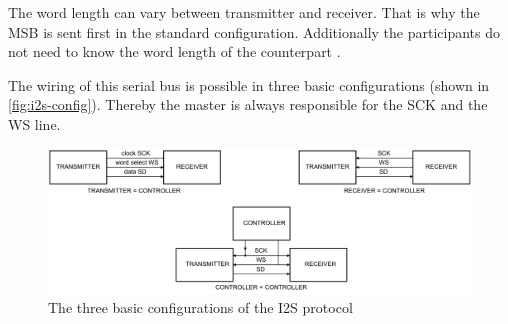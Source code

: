 The word length can vary between transmitter and receiver. That is why the \ac{MSB} is sent first in the standard 
configuration. Additionally the participants do not need to know the word length of the counterpart \cite{nxp_i2s}.

The wiring of this serial bus is possible in three basic configurations (shown in \autoref{fig:i2s-config}).
Thereby the master is always responsible for the SCK and the WS line.

\begin{figure}[!h]
    \centering
    \includegraphics[width=14cm]{img/i2s_config.png}
    \caption{The three basic configurations of the \ac{I2S} protocol \cite{nxp_i2s}}
    \label{fig:i2s-config}
\end{figure}


